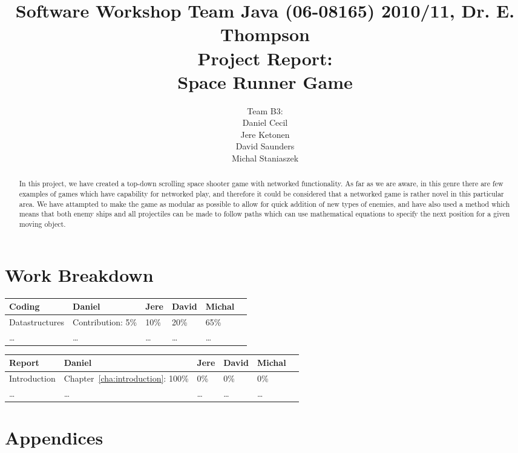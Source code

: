\documentclass[10pt]{report}
\title{%
{\normalsize Software Workshop Team Java (06-08165) 2010/11, Dr. E. Thompson}\\[2cm]
Project Report:\\
Space Runner Game}
\author{Team B3:\\
Daniel Cecil\\
Jere Ketonen\\
David Saunders\\
Michal Staniaszek
}
\begin{document}
\maketitle
\tableofcontents
\chapter*{Work Breakdown}
\label{work-breakdown}

\thispagestyle{empty}

{\small

\noindent\begin{tabular}{|l||l|l|l|l|l|}\hline
  \textbf{Coding} & \textbf{Daniel} & \textbf{Jere} & \textbf{David}
 & \textbf{Michal} \\\hline\hline
 Datastructures & Contribution: 5\% & 10\% & 20\% & 65\%\\\hline
 \ldots & \ldots & \ldots & \ldots & \ldots \\\hline
\end{tabular}\vspace*{1cm}

\noindent\begin{tabular}{|l||l|l|l|l|l|}\hline
  \textbf{Report} & \textbf{Daniel} & \textbf{Jere} & \textbf{David}
 & \textbf{Michal}\\\hline\hline
 Introduction & Chapter~\ref{cha:introduction}: 100\% & 0\% & 0\% & 0\%\\\hline
 \ldots & \ldots & \ldots & \ldots & \ldots \\\hline
\end{tabular}

}     %


\begin{abstract}
In this project, we have created a top-down scrolling space shooter game with networked functionality. As far as we are aware, in this genre there are few examples of games which have capability for networked play, and therefore it could be considered that a networked game is rather novel in this particular area. We have attampted to make the game as modular as possible to allow for quick addition of new types of enemies, and have also used a method which means that both enemy ships and all projectiles can be made to follow paths which can use mathematical equations to specify the next position for a given moving object.\end{abstract}




\chapter{Appendices}




\end{document}
